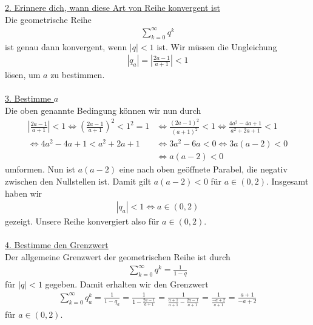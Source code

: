 \underline{2. Erinnere dich, wann diese Art von Reihe konvergent ist}\\
Die geometrische Reihe
\begin{align*}
\sum \limits_{k=0}^\infty q^k
\end{align*}
ist genau dann konvergent, wenn $|q| < 1$ ist.
Wir müssen die Ungleichung 
\begin{align*}
|q_a| = \left| \frac{2 a -1}{a+1} \right| < 1
\end{align*}
lösen, um $a$ zu bestimmen.\\
\\
\underline{3. Bestimme $a$}\\
Die oben genannte Bedingung können wir nun durch
\begin{align*}
\left| \frac{2 a -1}{a+1} \right| < 1
\Leftrightarrow
\left( \frac{2 a -1}{a+1} \right)^2 < 1^2 = 1
&\Leftrightarrow
\frac{(2a-1)^2}{(a+1)^2} < 1
\Leftrightarrow
\frac{4a^2 -4a +1}{a^2 +2a +1} < 1\\
\Leftrightarrow
4a^2 -4a +1 < a^2 +2a +1
&\Leftrightarrow
3a^2-6a < 0
\Leftrightarrow
3a (a -2)< 0\\
&\Leftrightarrow
a (a -2) < 0
\end{align*}
umformen.
Nun ist $a(a-2)$ eine nach oben geöffnete Parabel, die negativ zwischen den Nullstellen ist.
Damit gilt $a(a-2) < 0$ für $a \in (0,2)$.
Insgesamt haben wir 
\begin{align*}
|q_a| < 1 \Leftrightarrow a \in (0,2)
\end{align*}
gezeigt.
Unsere Reihe konvergiert also für $a \in (0,2)$.\\
\\

\underline{4. Bestimme den Grenzwert}\\
Der allgemeine Grenzwert der geometrischen Reihe ist durch
\begin{align*}
\sum \limits_{k=0}^\infty q^k = \frac{1}{1-q}
\end{align*}
für $|q| < 1 $ gegeben. Damit erhalten wir den Grenzwert
\begin{align*}
\sum \limits_{k=0}^\infty q_a^k 
= \frac{1}{1-q_a}
= \frac{1}{1- \frac{2a-1}{a+1}}
= \frac{1}{\frac{a+1}{a+1} - \frac{2a-1}{a+1}}
= \frac{1}{\frac{-a + 2}{a+1}}
=\frac{a+1}{-a+2}
\end{align*}
für $a \in (0,2)$.

\newpage
